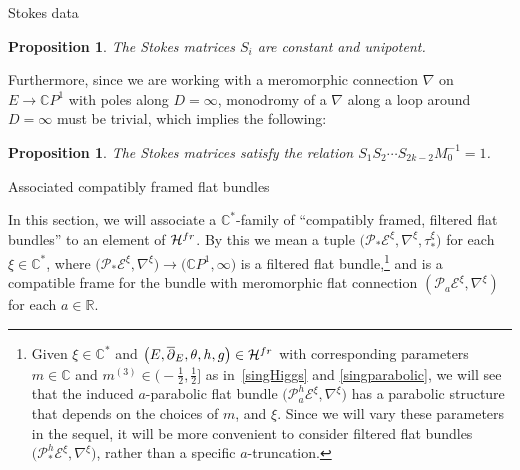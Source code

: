 \documentclass[11pt]{article}
\numberwithin{equation}{section}
\newtheorem{Proposition}[Theorem]{Proposition}
 { \theoremstyle{definition}
\newtheorem{Definition}[Theorem]{Definition}
\newtheorem{Notation}[Theorem]{Notation}
\newtheorem{Example}[Theorem]{Example}
\newtheorem{Remark}[Theorem]{Remark} }
\numberwithin{equation}{section}
\newcommand{\CP}{\mathbb{C}P^1}
\begin{document}
\begin{subsubsection}{Stokes data}
\begin{Proposition} The Stokes matrices $S_i$ are constant and unipotent.
\end{Proposition}


Furthermore, since we are working with a meromorphic connection $\nabla$ on $E\to \CP$ with poles along $D=\infty$, monodromy of a $\nabla$ along a loop around $D=\infty$ must be trivial, which implies the following:

\begin{Proposition}\label{MonodromyStokes} The Stokes matrices satisfy the relation $S_1S_2\cdots S_{2k-2}M_0^{-1}=1$.
\end{Proposition}
\end{subsubsection}

\begin{subsubsection}{Associated compatibly framed flat bundles}

In this section, we will associate a $\mathbb{C}^*$-family of ``compatibly framed, filtered flat bundles'' to an element of $\mathcal{H}^{{\rm fr}}$. By this we mean a tuple $\bigl(\mathcal{P}_*\mathcal{E}^{\xi},\nabla^{\xi}, \tau_*^{\xi}\bigr)$ for each $\xi\in \mathbb{C}^*$, where $\bigl(\mathcal{P}_*\mathcal{E}^{\xi},\nabla^{\xi}\bigr) \to \bigl(\CP,\infty\bigr)$ is a filtered flat bundle,\footnote{Given $\xi \in \mathbb{C}^*$ and $\bigl(E,\overline{\partial}_E,\theta,h,g\bigr)\in \mathcal{H}^{{\rm fr}}$ with corresponding parameters $m\in \mathbb{C}$ and $m^{(3)}\in \bigl(-\frac12,\frac12\bigr]$ as in~\eqref{singHiggs} and \eqref{singparabolic}, we will see that the induced $a$-parabolic flat bundle $\bigl(\mathcal{P}^h_a\mathcal{E}^{\xi},\nabla^{\xi}\bigr)$ has a parabolic structure that depends on the choices of $m$,  and $\xi$. Since we will vary these parameters in the sequel, it will be more convenient to consider filtered flat bundles $\bigl(\mathcal{P}_*^h\mathcal{E}^{\xi},\nabla^{\xi}\bigr)$, rather than a specific $a$-truncation.} and  is a compatible frame for the bundle with meromorphic flat connection $(\mathcal{P}_a\mathcal{E}^{\xi},\nabla^{\xi})$ for each $a\in \mathbb{R}$.


\end{subsubsection}
\end{document}
